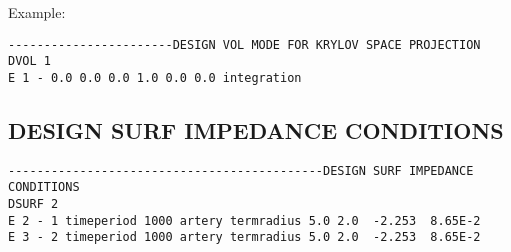 Example:

\begin{verbatim}
-----------------------DESIGN VOL MODE FOR KRYLOV SPACE PROJECTION
DVOL 1
E 1 - 0.0 0.0 0.0 1.0 0.0 0.0 integration
\end{verbatim}


\subsection{DESIGN SURF IMPEDANCE CONDITIONS}

\begin{verbatim}
--------------------------------------------DESIGN SURF IMPEDANCE CONDITIONS
DSURF 2
E 2 - 1 timeperiod 1000 artery termradius 5.0 2.0  -2.253  8.65E-2
E 3 - 2 timeperiod 1000 artery termradius 5.0 2.0  -2.253  8.65E-2
\end{verbatim}

